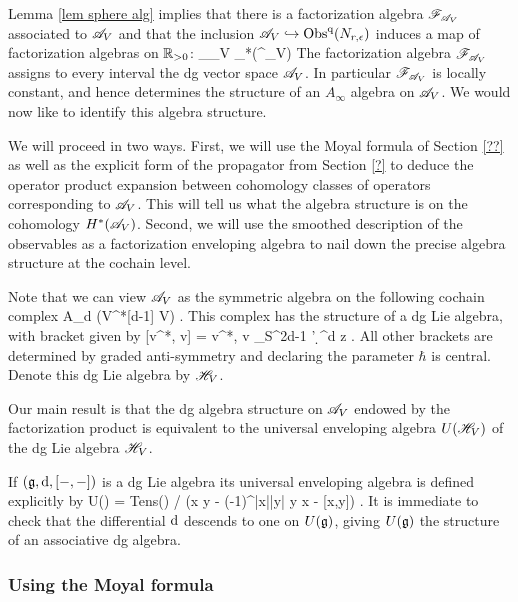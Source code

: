 \documentclass[10pt]{amsart}
\begin{document}
Lemma \ref{lem sphere alg} implies that there is a factorization algebra $\mathscr F_{\mathscr A_V}$ associated to $\mathscr A_V$ and that the inclusion $\mathscr A_V \hookrightarrow {\rm Obs}^{\rm q}(N_{r,\epsilon})$ induces a map of factorization algebras on $\mathbb R_{>0}$:
\ben
\sF_{\sA_V} \to \pi_*(\Obs^\q_V) 
\een
The factorization algebra $\mathscr F_{\mathscr A_V}$ assigns to every interval the dg vector space $\mathscr A_V$. 
In particular $\mathscr F_{\mathscr A_V}$ is locally constant, and hence determines the structure of an $A_\infty$ algebra on $\mathscr A_V$. 
We would now like to identify this algebra structure. 

We will proceed in two ways. 
First, we will use the Moyal formula of Section \ref{??} as well as the explicit form of the propagator from Section \ref{?} to deduce the operator product expansion between cohomology classes of operators corresponding to $\mathscr A_V$. 
This will tell us what the algebra structure is on the cohomology $H^*(\mathscr A_V)$. 
Second, we will use the smoothed description of the observables as a factorization enveloping algebra to nail down the precise algebra structure at the cochain level. 

Note that we can view $\mathscr A_V$ as the symmetric algebra on the following cochain complex
\ben
A_d \tensor (V^*[d-1] \tensor V) \oplus \CC \cdot \hbar .
\een
This complex has the structure of a dg Lie algebra, with bracket given by
\be\label{HV bracket}
[\alpha \tensor v^*, \alpha \tensor v] = \hbar \<v^*, v\> \oint_{S^{2d-1}} \alpha \wedge \alpha'  \d^d z .
\ee
All other brackets are determined by graded anti-symmetry and declaring the parameter $\hbar$ is central.
Denote this dg Lie algebra by $\mathscr H_V$. 

Our main result is that the dg algebra structure on $\mathscr A_V$ endowed by the factorization product is equivalent to the universal enveloping algebra $U(\mathscr H_V)$ of the dg Lie algebra $\mathscr H_V$.

\begin{rmk}
If $(\mathfrak g, {\rm d}, [-,-])$ is a dg Lie algebra its universal enveloping algebra is defined explicitly by 
\ben
U(\fg) = {\rm Tens}(\fg) / (x \tensor y - (-1)^{|x||y|} y \tensor x - [x,y]) .
\een
It is immediate to check that the differential ${\rm d}$ descends to one on $U(\mathfrak g)$, giving $U(\mathfrak g)$ the structure of an associative dg algebra.
\end{rmk}

\subsubsection{Using the Moyal formula}
\end{document}
